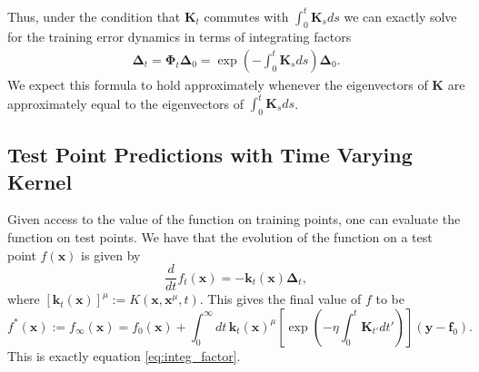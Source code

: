 \documentclass{article} %
\begin{document}
\begin{appendix}
Thus, under the condition that $\bm K_t $ commutes with $\int_0^t \bm K_s ds$ we can exactly solve for the training error dynamics in terms of integrating factors
\begin{align}
    \bm\Delta_t = \bm\Phi_t \bm\Delta_0 = \exp\left( - \int_0^t \bm K_s ds \right) \bm\Delta_0 .
\end{align}
We expect this formula to hold approximately whenever the eigenvectors of $\bm K$ are approximately equal to the eigenvectors of $\int_0^t \bm K_s ds$.  

\subsection{Test Point Predictions with Time Varying Kernel}
Given access to the value of the function on training points, one can evaluate the function on test points. We have that the evolution of the function on a test point $f(\bm x)$ is given by
\begin{equation}
    \frac{d}{dt} f_t(\bm x) = - \bm k_t (\bm x) \bm \Delta_t,
\end{equation}
where $[\bm k_t (\bm x)]^\mu := K(\bm x, \bm x^\mu, t)$. This gives the final value of $f$ to be
\begin{equation}
    f^*(\bm x) := f_{\infty}(\bm x) = f_0(\bm x) + \int_0^\infty dt \, \bm k_t(\bm x)^\mu \left[\exp\left(- \eta \int_0^t \bm K_{t'} dt' \right) \right] (\bm y - \bm f_0).
\end{equation}
This is exactly equation \ref{eq:integ_factor}.




\end{appendix}
\end{document}

